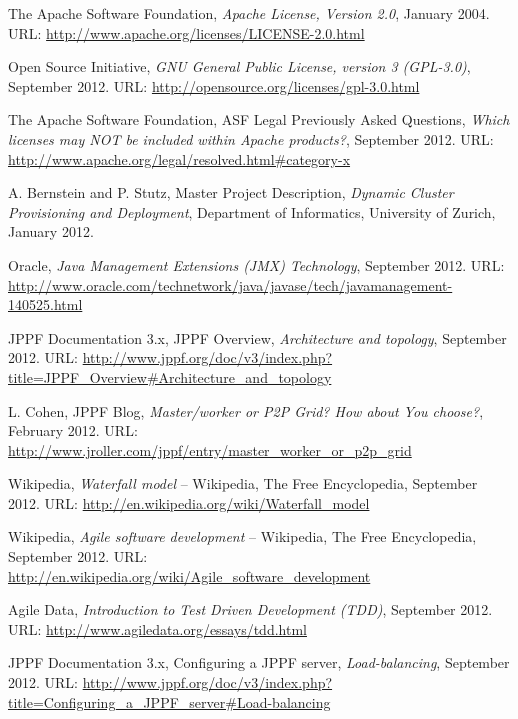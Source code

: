 \documentclass[english]{uzhpub}
\begin{document}
\begin{thebibliography}{99}

  The Apache Software Foundation,
  \emph{Apache License, Version 2.0},
  January 2004.
  URL: \url{http://www.apache.org/licenses/LICENSE-2.0.html}

  Open Source Initiative,
  \emph{GNU General Public License, version 3 (GPL-3.0)},
  September 2012.
  URL: \url{http://opensource.org/licenses/gpl-3.0.html}

  The Apache Software Foundation,
  ASF Legal Previously Asked Questions, \emph{Which licenses may NOT be included within Apache products?},
  September 2012.
  URL: \url{http://www.apache.org/legal/resolved.html#category-x}
  
  A. Bernstein and P. Stutz,
  Master Project Description, \emph{Dynamic Cluster Provisioning and Deployment},
  Department of Informatics, University of Zurich,
  January 2012.

  Oracle,
  \emph{Java Management Extensions (JMX) Technology},
  September 2012.
  URL: \url{http://www.oracle.com/technetwork/java/javase/tech/javamanagement-140525.html}

  JPPF Documentation 3.x, 
  JPPF Overview, \emph{Architecture and topology},
  September 2012.
  URL: \url{http://www.jppf.org/doc/v3/index.php?title=JPPF_Overview#Architecture_and_topology}

  L. Cohen, 
  JPPF Blog, \emph{Master/worker or P2P Grid? How about You choose?},
  February 2012.
  URL: \url{http://www.jroller.com/jppf/entry/master_worker_or_p2p_grid}

  Wikipedia, 
  \emph{Waterfall model} -- Wikipedia, The Free Encyclopedia,
  September 2012.
  URL: \url{http://en.wikipedia.org/wiki/Waterfall_model}

  Wikipedia, 
  \emph{Agile software development} -- Wikipedia, The Free Encyclopedia,
  September 2012.
  URL: \url{http://en.wikipedia.org/wiki/Agile_software_development}
  
  Agile Data, 
  \emph{Introduction to Test Driven Development (TDD)},
  September 2012.
  URL: \url{http://www.agiledata.org/essays/tdd.html}
  
  JPPF Documentation 3.x, 
  Configuring a JPPF server, \emph{Load-balancing},
  September 2012.
  URL: \url{http://www.jppf.org/doc/v3/index.php?title=Configuring_a_JPPF_server#Load-balancing}

\end{thebibliography}

\newpage

\appendix


\end{document}
